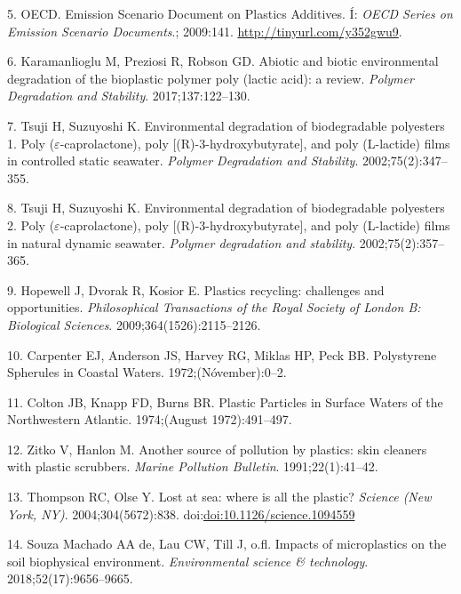 \documentclass[icelandic,]{book}
\begin{document}
\leavevmode\hypertarget{ref-OECD2009}{}%
5. OECD. Emission Scenario Document on Plastics Additives. Í: \emph{OECD Series on Emission Scenario Documents}.; 2009:141. \url{http://tinyurl.com/y352gwu9}.

\leavevmode\hypertarget{ref-karamanlioglu2017abiotic}{}%
6. Karamanlioglu M, Preziosi R, Robson GD. Abiotic and biotic environmental degradation of the bioplastic polymer poly (lactic acid): a review. \emph{Polymer Degradation and Stability}. 2017;137:122--130.

\leavevmode\hypertarget{ref-tsuji2002environmental-1}{}%
7. Tsuji H, Suzuyoshi K. Environmental degradation of biodegradable polyesters 1. Poly (\(\varepsilon\)-caprolactone), poly {[}(R)-3-hydroxybutyrate{]}, and poly (L-lactide) films in controlled static seawater. \emph{Polymer Degradation and Stability}. 2002;75(2):347--355.

\leavevmode\hypertarget{ref-tsuji2002environmental-2}{}%
8. Tsuji H, Suzuyoshi K. Environmental degradation of biodegradable polyesters 2. Poly (\(\varepsilon\)-caprolactone), poly {[}(R)-3-hydroxybutyrate{]}, and poly (L-lactide) films in natural dynamic seawater. \emph{Polymer degradation and stability}. 2002;75(2):357--365.

\leavevmode\hypertarget{ref-hopewell2009plastics}{}%
9. Hopewell J, Dvorak R, Kosior E. Plastics recycling: challenges and opportunities. \emph{Philosophical Transactions of the Royal Society of London B: Biological Sciences}. 2009;364(1526):2115--2126.

\leavevmode\hypertarget{ref-Waters1972}{}%
10. Carpenter EJ, Anderson JS, Harvey RG, Miklas HP, Peck BB. Polystyrene Spherules in Coastal Waters. 1972;(Nóvember):0--2.

\leavevmode\hypertarget{ref-Colton1974}{}%
11. Colton JB, Knapp FD, Burns BR. Plastic Particles in Surface Waters of the Northwestern Atlantic. 1974;(August 1972):491--497.

\leavevmode\hypertarget{ref-zitko1991another}{}%
12. Zitko V, Hanlon M. Another source of pollution by plastics: skin cleaners with plastic scrubbers. \emph{Marine Pollution Bulletin}. 1991;22(1):41--42.

\leavevmode\hypertarget{ref-Thompson2004lost}{}%
13. Thompson RC, Olse Y. Lost at sea: where is all the plastic? \emph{Science (New York, NY)}. 2004;304(5672):838. doi:\href{https://doi.org/doi:10.1126/science.1094559}{doi:10.1126/science.1094559}

\leavevmode\hypertarget{ref-de2018impacts}{}%
14. Souza Machado AA de, Lau CW, Till J, o.fl. Impacts of microplastics on the soil biophysical environment. \emph{Environmental science \& technology}. 2018;52(17):9656--9665.
\end{document}
